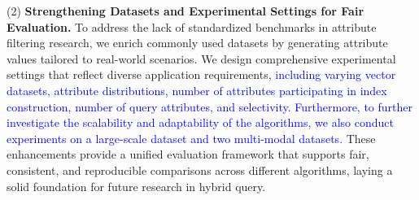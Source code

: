 \documentclass[sigconf, nonacm]{acmart}
\begin{document}
	(2) \textbf{Strengthening Datasets and Experimental Settings for Fair Evaluation.}
	To address the lack of standardized benchmarks in attribute filtering research, we enrich commonly used datasets by generating attribute values tailored to real-world scenarios. We design comprehensive experimental settings that reflect diverse application requirements, \textcolor{blue}{including varying vector datasets, attribute distributions, number of attributes participating in index construction, number of query attributes, and selectivity. Furthermore, to further investigate the scalability and adaptability of the algorithms, we also conduct experiments on a large-scale dataset and two multi-modal datasets.}  These enhancements provide a unified evaluation framework that supports fair, consistent, and reproducible comparisons across different algorithms, laying a solid foundation for future research in hybrid query.


\end{document}
